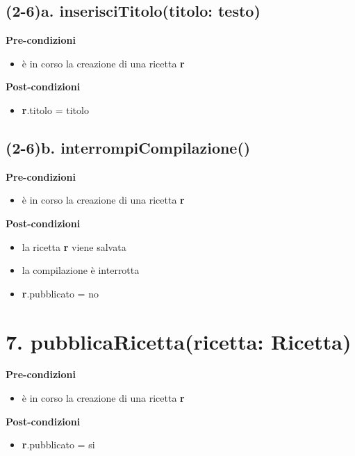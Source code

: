 \documentclass[14pt]{extarticle}
\begin{document}
\subsection*{(2-6)a. inserisciTitolo(titolo: testo)}

\textbf{Pre-condizioni}
\begin{itemize}
  \item è in corso la creazione di una ricetta  \textbf{r}
\end{itemize}
\textbf{Post-condizioni}
\begin{itemize}
  \item \textbf{r}.titolo = titolo
\end{itemize}

\subsection*{(2-6)b. interrompiCompilazione()}

\textbf{Pre-condizioni}
\begin{itemize}
  \item è in corso la creazione di una ricetta  \textbf{r}
\end{itemize}
\textbf{Post-condizioni}
\begin{itemize}
  \item la ricetta  \textbf{r} viene salvata
  \item la compilazione è interrotta
  \item \textbf{r}.pubblicato = no
\end{itemize}

\section*{7. pubblicaRicetta(ricetta: Ricetta)}

\textbf{Pre-condizioni}
\begin{itemize}
  \item è in corso la creazione di una ricetta  \textbf{r}
\end{itemize}
\textbf{Post-condizioni}
\begin{itemize}
  \item \textbf{r}.pubblicato = si
\end{itemize}
\end{document}
